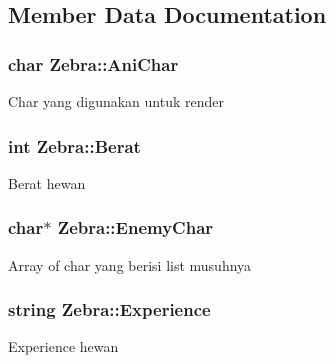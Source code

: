 \subsection{Member Data Documentation}
\subsubsection[{\texorpdfstring{Ani\+Char}{AniChar}}]{\setlength{\rightskip}{0pt plus 5cm}char Zebra\+::\+Ani\+Char\hspace{0.3cm}{\ttfamily [protected]}}\hypertarget{class_zebra_aec6d713965ae1fcb374d9911b4880b29}{}\label{class_zebra_aec6d713965ae1fcb374d9911b4880b29}
Char yang digunakan untuk render 
\subsubsection[{\texorpdfstring{Berat}{Berat}}]{\setlength{\rightskip}{0pt plus 5cm}int Zebra\+::\+Berat\hspace{0.3cm}{\ttfamily [protected]}}\hypertarget{class_zebra_ae450c8048eda3d54f3dc2ec7eb92d79f}{}\label{class_zebra_ae450c8048eda3d54f3dc2ec7eb92d79f}
Berat hewan 
\subsubsection[{\texorpdfstring{Enemy\+Char}{EnemyChar}}]{\setlength{\rightskip}{0pt plus 5cm}char$\ast$ Zebra\+::\+Enemy\+Char\hspace{0.3cm}{\ttfamily [protected]}}\hypertarget{class_zebra_a3caeeff6684cd124449f2717787bed00}{}\label{class_zebra_a3caeeff6684cd124449f2717787bed00}
Array of char yang berisi list musuhnya 
\subsubsection[{\texorpdfstring{Experience}{Experience}}]{\setlength{\rightskip}{0pt plus 5cm}string Zebra\+::\+Experience\hspace{0.3cm}{\ttfamily [protected]}}\hypertarget{class_zebra_a9be71c3f041c760f4096179647f21532}{}\label{class_zebra_a9be71c3f041c760f4096179647f21532}
Experience hewan 
